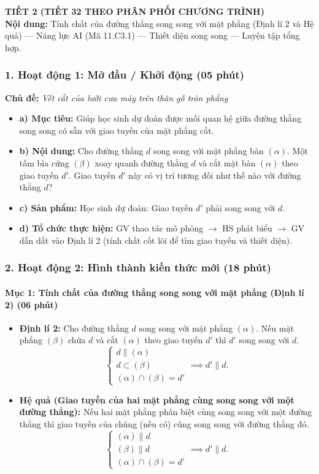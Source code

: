\documentclass[12pt, a4paper]{article}
\begin{document}
\newpage

{\large \textbf{TIẾT 2 (TIẾT 32 THEO PHÂN PHỐI CHƯƠNG TRÌNH)}}\\[0.3em]
\textbf{Nội dung:} Tính chất của đường thẳng song song với mặt phẳng (Định lí 2 và Hệ quả) --- Năng lực AI (Mã 11.C3.1) --- Thiết diện song song --- Luyện tập tổng hợp.

\subsubsection*{1. Hoạt động 1: Mở đầu / Khởi động (05 phút)}
\textbf{Chủ đề:} \textit{Vết cắt của lưỡi cưa máy trên thân gỗ tròn phẳng}
\begin{itemize}
    \item \textbf{a) Mục tiêu:} Giúp học sinh dự đoán được mối quan hệ giữa đường thẳng song song có sẵn với giao tuyến của mặt phẳng cắt.
    \item \textbf{b) Nội dung:} Cho đường thẳng $d$ song song với mặt phẳng bàn $(\alpha)$. Một tấm bìa cứng $(\beta)$ xoay quanh đường thẳng $d$ và cắt mặt bàn $(\alpha)$ theo giao tuyến $d'$. Giao tuyến $d'$ này có vị trí tương đối như thế nào với đường thẳng $d$?
    \item \textbf{c) Sản phẩm:} Học sinh dự đoán: Giao tuyến $d'$ phải song song với $d$.
    \item \textbf{d) Tổ chức thực hiện:} GV thao tác mô phỏng $\to$ HS phát biểu $\to$ GV dẫn dắt vào Định lí 2 (tính chất cốt lõi để tìm giao tuyến và thiết diện).
\end{itemize}

\subsubsection*{2. Hoạt động 2: Hình thành kiến thức mới (18 phút)}

\paragraph{Mục 1: Tính chất của đường thẳng song song với mặt phẳng (Định lí 2) (06 phút)}
\begin{itemize}
    \item \textbf{Định lí 2:} Cho đường thẳng $d$ song song với mặt phẳng $(\alpha)$. Nếu mặt phẳng $(\beta)$ chứa $d$ và cắt $(\alpha)$ theo giao tuyến $d'$ thì $d'$ song song với $d$.
    $$\begin{cases} d \parallel (\alpha) \\ d \subset (\beta) \\ (\alpha) \cap (\beta) = d' \end{cases} \implies d' \parallel d.$$
    \item \textbf{Hệ quả (Giao tuyến của hai mặt phẳng cùng song song với một đường thẳng):} Nếu hai mặt phẳng phân biệt cùng song song với một đường thẳng thì giao tuyến của chúng (nếu có) cũng song song với đường thẳng đó.
    $$\begin{cases} (\alpha) \parallel d \\ (\beta) \parallel d \\ (\alpha) \cap (\beta) = d' \end{cases} \implies d' \parallel d.$$
\end{itemize}
\end{document}
